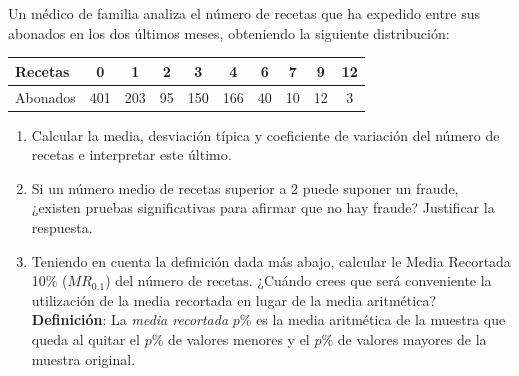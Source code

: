 {Un médico de familia analiza el número de recetas que ha expedido entre sus abonados en los dos últimos meses, obteniendo la siguiente distribución:
\begin{center}
\begin{tabular}{|l|ccccccccc|}
\hline
Recetas & 0 & 1 & 2 & 3 & 4 & 6 & 7 & 9 & 12\\
\hline
Abonados & 401 & 203 & 95 & 150 & 166 & 40 & 10 & 12 & 3\\
\hline
\end{tabular}
\end{center}

\begin{enumerate}
\item Calcular la media, desviación tí­pica y coeficiente de variación del número de recetas e interpretar este último.
\item Si un número medio de recetas superior a 2 puede suponer un fraude, ¿existen pruebas significativas para afirmar que no hay fraude? Justificar la respuesta.
\item Teniendo en cuenta la definición dada más abajo, calcular le Media Recortada 10\% ($MR_{0.1}$) del número de recetas.
¿Cuándo crees que será conveniente la utilización de la media recortada en lugar de la media aritmética?\\
\textbf{Definición}: La \emph{media recortada} $p$\% es la media aritmética de la muestra que queda al quitar el $p$\%
de valores menores y el $p$\% de valores mayores de la muestra original.
\end{enumerate}
}


